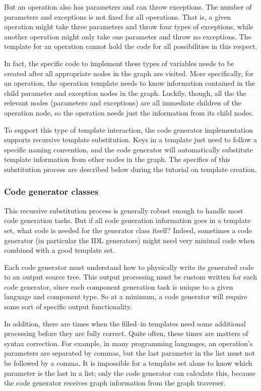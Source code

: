 But an operation also has parameters and can throw exceptions. The number of
parameters and exceptions is not fixed for all operations. That is, a given
operation might take three parameters and throw four types of exceptions, while
another operation might only take one parameter and throw no exceptions. The
template for an operation cannot hold the code for all possibilities in this
respect.

In fact, the specific code to implement these types of variables needs to be
created after all appropriate nodes in the graph are visited. More specifically,
for an operation, the operation template needs to know information contained in
the child parameter and exception nodes in the graph. Luckily, though, all the
the relevant nodes (parameters and exceptions) are all immediate children of the
operation node, so the operation needs just the information from its child
nodes.

To support this type of template interaction, the code generator implementation
supports recursive template substitution. Keys in a template just need to follow
a specific naming convention, and the code generator will automatically
substitute template information from other nodes in the graph. The specifics of
this substitution process are described below during the tutorial on template
creation.

\subsubsection{Code generator classes}

This recursive substitution process is generally robust enough to handle most
code generation tasks. But if all code generation information goes in a template
set, what code is needed for the generator class itself? Indeed, sometimes a
code generator (in particular the IDL generators) might need very minimal code
when combined with a good template set.

Each code generator must understand how to physically write its generated code
to an output source tree. This output processing must be custom written for each
code generator, since each component generation task is unique to a given
language and component type. So at a minimum, a code generator will require some
sort of specific output functionality.

In addition, there are times when the filled--in templates need some additional
processing before they are fully correct. Quite often, these times are matters
of syntax correction. For example, in many programming languages, an operation's
parameters are separated by commas, but the last parameter in the list must not
be followed by a comma. It is impossible for a template set alone to know which
parameter is the last in a list; only the code generator can calculate this,
because the code generator receives graph information from the graph traverser.

